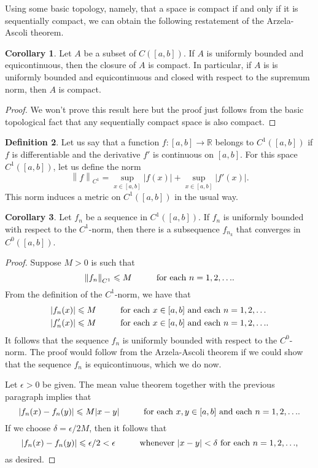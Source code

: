 \documentclass[12pt]{article}
\newcommand{\norm}[1]{\left\lVert#1\right\rVert}
\theoremstyle{definition}
\newtheorem{definition}{Definition}
\theoremstyle{theorem}
\newtheorem{corollary}[definition]{Corollary}
\begin{document}
Using some basic topology, namely, that a space is compact if and only if it is sequentially compact, we can obtain the following restatement of the Arzela-Ascoli theorem. 

\begin{corollary}
Let $A$ be a subset of $C([a,b])$. If $A$ is uniformly bounded and equicontinuous, then the closure of $A$ is compact. In particular, if $A$ is is uniformly bounded and equicontinuous and closed with respect to the supremum norm, then $A$ is compact. 
\end{corollary}

\begin{proof}
We won't prove this result here but the proof just follows from the basic topological fact that any sequentially compact space is also compact. 
\end{proof}

\begin{definition}
Let us say that a function $f : [a,b] \to \mathbb{R}$ belongs to $C^1([a,b])$ if $f$ is differentiable and the derivative $f'$ is continuous on $[a,b]$. For this space $C^{1}([a,b])$, let us define the norm 
\[
\norm{f}_{C^1} = \sup_{x \in [a,b]}|f(x)| + \sup_{x \in [a,b]}|f'(x)|.
\]
This norm induces a metric on $C^1([a,b])$ in the usual way. 
\end{definition}

\begin{corollary}
Let $f_n$ be a sequence in $C^1([a,b])$. If $f_n$ is uniformly bounded with respect to the $C^1$-norm, then there is a subsequence $f_{n_k}$ that converges in $C^0([a,b])$. 
\end{corollary}

\begin{proof}
Suppose $M > 0$ is such that 
\[
\norm{f_n}_{C^1} \leqslant M \hspace{10mm} \text{for each $n = 1, 2, \ldots$}.
\]
From the definition of the $C^1$-norm, we have that  
\begin{align*}
|f_n(x)| &\leqslant M \hspace{10mm} \text{for each $x \in [a,b]$ and each $n=1, 2, \ldots$} \\
|f_n'(x)| &\leqslant M \hspace{10mm} \text{for each $x \in [a,b]$ and each $n=1, 2, \ldots$}.
\end{align*}
It follows that the sequence $f_n$ is uniformly bounded with respect to the $C^0$-norm. The proof would follow from the Arzela-Ascoli theorem if we could show that the sequence $f_n$ is equicontinuous, which we do now. 

Let $\epsilon > 0$ be given. The mean value theorem together with the previous paragraph implies that 
\[
|f_n(x) - f_n(y)| \leqslant M |x - y| \hspace{10mm} \text{for each $x,y \in [a,b]$ and each $n=1, 2, \ldots$}. 
\] 
If we choose $\delta = \epsilon/2M$, then it follows that 
\[
|f_n(x) - f_n(y)| \leqslant \epsilon/2 < \epsilon \hspace{10mm} \text{whenever $|x-y| < \delta$ for each $n=1, 2, \ldots$},
\] 
as desired. 
\end{proof}
\end{document}
